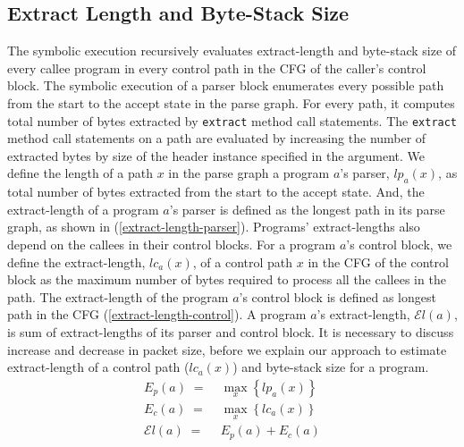 \subsection{Extract Length and Byte-Stack Size}
\label{subsection:extract-length-and-byte-stack-size}
The symbolic execution recursively evaluates extract-length and byte-stack size of every callee program in every control path in the CFG of the caller's control block.
The symbolic execution of a parser block enumerates every possible path from the start to the accept state in the parse graph.
For every path, it computes total number of bytes extracted by \texttt{extract} method call statements.
The \texttt{extract} method call statements on a path are evaluated by increasing the number of extracted bytes by size of the header instance specified in the argument.
We define the length of a path $x$ in the parse graph a program $a$'s parser, $lp_{a}(x)$, as total number of bytes extracted from the start to the accept state.
And, the extract-length of a program $a$'s parser is defined as the longest path in its parse graph, as shown in (\ref{extract-length-parser}).
Programs' extract-lengths also depend on the callees in their control blocks.
For a program $a$'s control block, we define the extract-length, $lc_{a}(x)$, of a control path $x$ in the CFG of the control block as the maximum number of bytes required to process all the callees in the path.
The extract-length of the program $a$'s control block is defined as longest path in the CFG (\ref{extract-length-control}).
A program $a$'s extract-length, $\mathcal{E}l(a)$, is sum of extract-lengths of its parser and control block.
It is necessary to discuss increase and decrease in packet size, before we explain our approach to estimate extract-length of a control path ($lc_{a}(x)$) and byte-stack size for a program.
\begin{align}
E_{p}(a)\; =& \; \max_{x}\left\{lp_{a}(x)\right\} \label{extract-length-parser} \\
E_{c}(a)\; =& \; \max_{x}\left\{lc_{a}(x)\right\} \label{extract-length-control} \\
\mathcal{E}l(a)\; =& \; E_{p}(a) + E_{c}(a) \label{extract-length-program}
\end{align}



